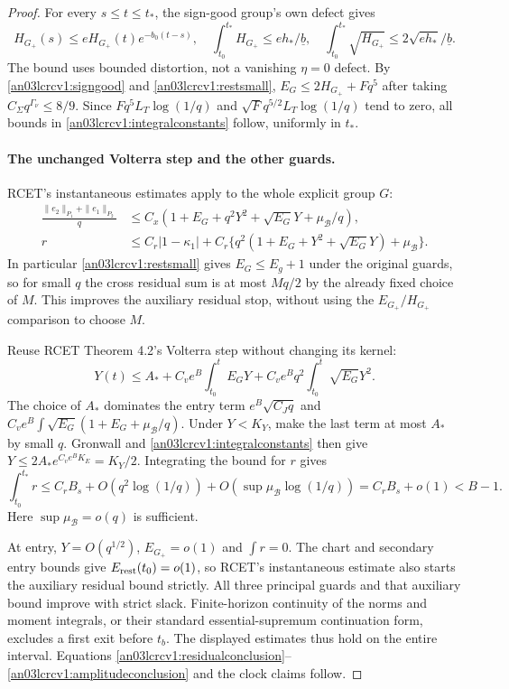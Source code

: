 \documentclass[11pt]{article}
\theoremstyle{remark}\newtheorem{remark}[theorem]{Remark}
\newcommand{\Gp}{G_+}
\begin{document}
\begin{proof}
For every $s\le t\le t_*$, the sign-good group's own defect gives
\[
 H_{\Gp}(s)\le eH_{\Gp}(t)e^{-b_0(t-s)},\quad
 \int_{t_0}^{t_*}H_{\Gp}\le eh_*/\underline b,\quad
 \int_{t_0}^{t_*}\sqrt{H_{\Gp}}
 \le2\sqrt{eh_*}/\underline b.
\]
The bound uses bounded distortion, not a vanishing $\eta=0$ defect.
By \eqref{an03lcrcv1:signgood} and \eqref{an03lcrcv1:restsmall},
$E_G\le2H_{\Gp}+Fq^5$ after taking
$C_\Sigma q^{\Gamma_\nu}\le 8/9$.
Since $Fq^5L_T\log(1/q)$ and
$\sqrt Fq^{5/2}L_T\log(1/q)$ tend to zero, all bounds in
\eqref{an03lcrcv1:integralconstants} follow, uniformly in $t_*$.

\paragraph{The unchanged Volterra step and the other guards.}
RCET's instantaneous estimates apply to the whole explicit group $G$:
\begin{align*}
 \frac{\|e_2\|_{P_1}+\|e_1\|_{P_2}}q
 &\le C_x(1+E_G+q^2Y^2+\sqrt{E_G}Y+\mu_{\mathcal B}/q),\\
 r&\le C_r|1-\kappa_1|+
 C_r\{q^2(1+E_G+Y^2+\sqrt{E_G}Y)+\mu_{\mathcal B}\}.
\end{align*}
In particular \eqref{an03lcrcv1:restsmall} gives $E_G\le E_g+1$
under the original guards, so for small $q$ the cross residual sum
is at most $Mq/2$ by the already fixed choice of $M$.
This improves the auxiliary residual stop, without using the
$E_{\Gp}/H_{\Gp}$ comparison to choose $M$.

Reuse RCET Theorem 4.2's Volterra step without changing its kernel:
\begin{equation}\label{an03lcrcv1:volterra}
 Y(t)\le A_*+C_ve^B\int_{t_0}^t E_GY
             +C_ve^Bq^2\int_{t_0}^t\sqrt{E_G}Y^2.
\end{equation}
The choice of $A_*$ dominates the entry term $e^B\sqrt{C_Jq}$
and $C_ve^B\int\sqrt{E_G}(1+E_G+\mu_{\mathcal B}/q)$.
Under $Y<K_Y$, make the last term at most $A_*$ by small $q$.
Gronwall and \eqref{an03lcrcv1:integralconstants} then give
$Y\le2A_*e^{C_ve^BK_E}=K_Y/2$.
Integrating the bound for $r$ gives
\[
 \int_{t_0}^{t_*}r\le C_rB_s+
 O(q^2\log(1/q))+O(\sup\mu_{\mathcal B}\log(1/q))
 =C_rB_s+o(1)<B-1.
\]
Here $\sup\mu_{\mathcal B}=o(q)$ is sufficient.

At entry, $Y=O(q^{1/2})$, $E_{\Gp}=o(1)$ and $\int r=0$.
The chart and secondary entry bounds give $E_{\rm rest}(t_0)=o(1)$,
so RCET's instantaneous estimate also starts the auxiliary residual
bound strictly. All three principal guards and that auxiliary bound
improve with strict slack. Finite-horizon continuity of the norms
and moment integrals, or their standard essential-supremum
continuation form, excludes a first exit before $t_b$.
The displayed estimates thus hold on the entire interval.
Equations \eqref{an03lcrcv1:residualconclusion}--
\eqref{an03lcrcv1:amplitudeconclusion} and the clock claims follow.
\end{proof}
\end{document}
